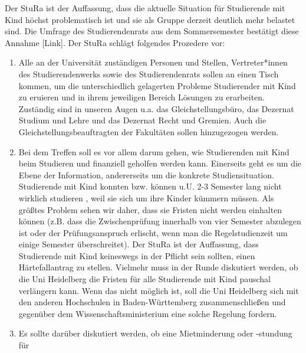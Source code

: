     {
        Der StuRa ist der Auffassung, dass die aktuelle Situation für Studierende mit Kind
        höchst
        problematisch ist und sie als Gruppe derzeit deutlich mehr belastet sind. Die Umfrage
        des
        Studierendenrats aus dem Sommersemester bestätigt diese Annahme [Link]. Der StuRa
        schlägt
        folgendes Prozedere vor:
        \begin{enumerate}
            \item {Alle an der Universität zuständigen Personen und Stellen, Vertreter*innen des
            Studierendenwerks sowie des Studierendenrats sollen an einen Tisch kommen, um die
            unterschiedlich gelagerten Probleme Studierender mit Kind zu eruieren und in ihrem
            jeweiligen Bereich Lösungen zu erarbeiten. Zuständig sind in unseren Augen u.a. das 
            Gleichstellungsbüro, das Dezernat Studium und Lehre und das Dezernat Recht und
            Gremien. Auch die Gleichstellungsbeauftragten der Fakultäten sollen hinzugezogen
            werden.}
            \item {Bei dem Treffen soll es vor allem darum gehen, wie Studierenden mit Kind beim
            Studieren
            und finanziell geholfen werden kann. Einerseits geht es um die Ebene der Information,
            andererseits um die konkrete Studiensituation. Studierende mit Kind konnten bzw.
            können
            u.U. 2-3 Semester lang nicht wirklich studieren , weil sie sich um ihre Kinder
            kümmern
            müssen. Als größtes Problem sehen wir daher, dass sie Fristen nicht werden einhalten
            können (z.B. dass die Zwischenprüfung innerhalb von vier Semester abzulegen ist oder
            der
            Prüfungsanspruch erlischt, wenn man die Regelstudienzeit um einige Semester
            überschreitet). Der StuRa ist der Auffassung, dass Studierende mit Kind keineswegs in
            der
            Pflicht sein sollten, einen Härtefallantrag zu stellen. Vielmehr muss in der Runde
            diskutiert
            werden, ob die Uni Heidelberg die Fristen für alle Studierende mit Kind pauschal
            verlängern
            kann. Wenn das nicht möglich ist, soll die Uni Heidelberg sich mit den anderen
            Hochschulen
            in Baden-Württemberg zusammenschließen und gegenüber dem Wissenschaftsministerium
            eine solche Regelung fordern.}
            \item {Es sollte darüber diskutiert werden, ob eine Mietminderung oder -stundung für
}
\end{enumerate}}
